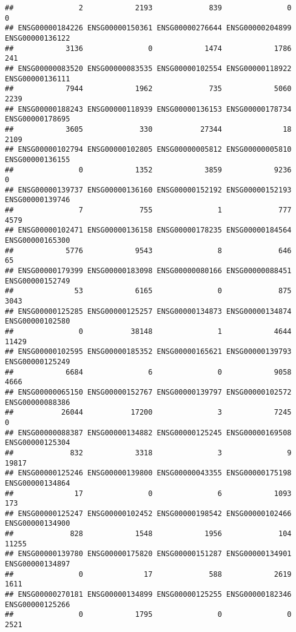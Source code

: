 \documentclass[
]{article}
\begin{document}
\begin{verbatim}
##               2            2193             839               0               0 
## ENSG00000184226 ENSG00000150361 ENSG00000276644 ENSG00000204899 ENSG00000136122 
##            3136               0            1474            1786             241 
## ENSG00000083520 ENSG00000083535 ENSG00000102554 ENSG00000118922 ENSG00000136111 
##            7944            1962             735            5060            2239 
## ENSG00000188243 ENSG00000118939 ENSG00000136153 ENSG00000178734 ENSG00000178695 
##            3605             330           27344              18            2109 
## ENSG00000102794 ENSG00000102805 ENSG00000005812 ENSG00000005810 ENSG00000136155 
##               0            1352            3859            9236               0 
## ENSG00000139737 ENSG00000136160 ENSG00000152192 ENSG00000152193 ENSG00000139746 
##               7             755               1             777            4579 
## ENSG00000102471 ENSG00000136158 ENSG00000178235 ENSG00000184564 ENSG00000165300 
##            5776            9543               8             646              65 
## ENSG00000179399 ENSG00000183098 ENSG00000080166 ENSG00000088451 ENSG00000152749 
##              53            6165               0             875            3043 
## ENSG00000125285 ENSG00000125257 ENSG00000134873 ENSG00000134874 ENSG00000102580 
##               0           38148               1            4644           11429 
## ENSG00000102595 ENSG00000185352 ENSG00000165621 ENSG00000139793 ENSG00000125249 
##            6684               6               0            9058            4666 
## ENSG00000065150 ENSG00000152767 ENSG00000139797 ENSG00000102572 ENSG00000088386 
##           26044           17200               3            7245               0 
## ENSG00000088387 ENSG00000134882 ENSG00000125245 ENSG00000169508 ENSG00000125304 
##             832            3318               3               9           19817 
## ENSG00000125246 ENSG00000139800 ENSG00000043355 ENSG00000175198 ENSG00000134864 
##              17               0               6            1093             173 
## ENSG00000125247 ENSG00000102452 ENSG00000198542 ENSG00000102466 ENSG00000134900 
##             828            1548            1956             104           11255 
## ENSG00000139780 ENSG00000175820 ENSG00000151287 ENSG00000134901 ENSG00000134897 
##               0              17             588            2619            1611 
## ENSG00000270181 ENSG00000134899 ENSG00000125255 ENSG00000182346 ENSG00000125266 
##               0            1795               0               0            2521 

\end{verbatim}
\end{document}
